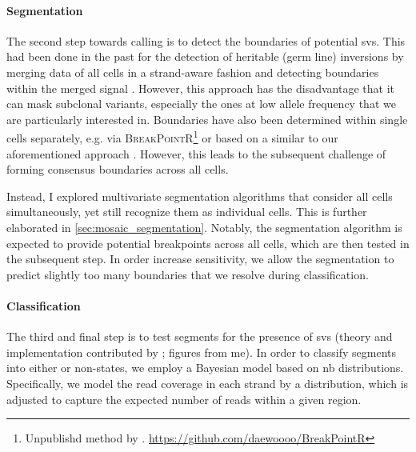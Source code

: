 \paragraph{Segmentation}
The second step towards \sv calling is to detect the boundaries of potential
\acp{sv}. This had been done in the past for the detection of heritable (germ
line) inversions by merging data of all cells in a strand-aware fashion
and detecting boundaries within the merged signal
\citep{Sanders2016}. However, this approach has the disadvantage that it can
mask subclonal variants, especially the ones at low allele frequency that we
are particularly interested in. Boundaries have also been determined within
single cells separately, e.g. via \textsc{BreakPointR}\footnote{Unpublishd
    method by \david. \url{https://github.com/daewoooo/BreakPointR}}
or based on a \hmm similar to our aforementioned approach \citep{Bakker2016}.
However, this leads to the subsequent challenge of forming consensus boundaries
across all cells.

Instead, I explored multivariate segmentation algorithms that consider
all cells simultaneously, yet still recognize them as individual cells. This is
further elaborated in \cref{sec:mosaic_segmentation}. Notably, the segmentation
algorithm is expected to provide potential \sv breakpoints across all cells, which are then
tested in the subsequent step. In order increase sensitivity, we allow the
segmentation to predict slightly too many boundaries that we resolve during classification.


\paragraph{Classification} The third and final step is to test segments for the
presence of \acp{sv} (theory and implementation contributed by \maryam; figures
from me). In order to classify segments into either \sv or non-\sv states, we
employ a Bayesian model based on \acl{nb} distributions.
Specifically, we model the read coverage in each strand by a \nb distribution,
which is adjusted to capture the expected number of reads within a given region.

